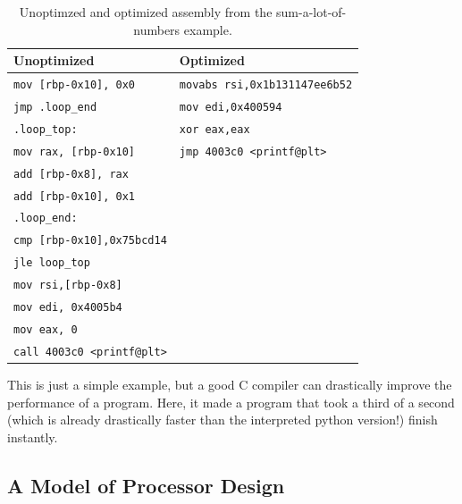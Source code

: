 \begin{table}[h]
	\centering
\begin{tabular}{l | l}
	\hline
	\textbf{Unoptimized} & \textbf{Optimized}\\
	\hline
	\texttt{mov [rbp-0x10], 0x0}	&\texttt{movabs rsi,0x1b131147ee6b52} \\
	\texttt{jmp .loop\_end			}	&\texttt{mov edi,0x400594} \\
	\texttt{.loop\_top:                } &\texttt{xor eax,eax   } \\
	\texttt{mov rax, [rbp-0x10]				}	&\texttt{jmp 4003c0 <printf@plt>}\\
	\texttt{add [rbp-0x8], rax				}	&\texttt{	} \\
	\texttt{add [rbp-0x10], 0x1				}	&\texttt{ }\\	
	\texttt{.loop\_end:                       } &\texttt{} \\
	\texttt{cmp [rbp-0x10],0x75bcd14} &\texttt{} \\
	\texttt{jle loop\_top} &\texttt{} \\
	\texttt{mov rsi,[rbp-0x8]} &\texttt{} \\
	\texttt{mov edi, 0x4005b4} &\texttt{} \\
	\texttt{mov eax, 0} &\texttt{} \\
	\texttt{call 4003c0 <printf@plt>} &\texttt{} \\
\end{tabular}
	\caption{Unoptimzed and optimized assembly from the sum-a-lot-of-numbers example.}
	\label{table:assem-1}
\end{table}

This is just a simple example, but a good C compiler can drastically improve the performance of a
program. Here, it made a program that took a third of a second (which is already drastically faster than
the interpreted python version!) finish instantly.

\subsection{A Model of Processor Design}



